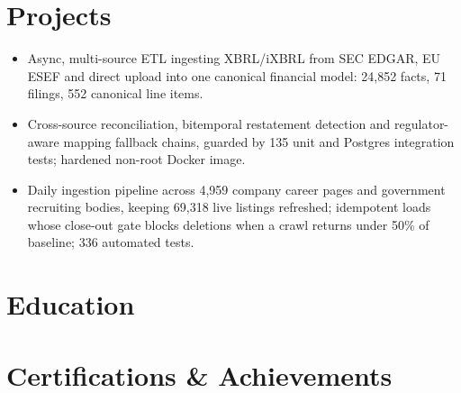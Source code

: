 \documentclass[10pt,a4paper]{article}
\begin{document}
\section{Projects}
\begin{itemize}
  \item Async, multi-source ETL ingesting XBRL/iXBRL from SEC EDGAR, EU ESEF and direct upload into one canonical financial model: 24,852 facts, 71 filings, 552 canonical line items.
  \item Cross-source reconciliation, bitemporal restatement detection and regulator-aware mapping fallback chains, guarded by 135 unit and Postgres integration tests; hardened non-root Docker image.
\end{itemize}

\begin{itemize}
  \item Daily ingestion pipeline across 4,959 company career pages and government recruiting bodies, keeping 69,318 live listings refreshed; idempotent loads whose close-out gate blocks deletions when a crawl returns under 50\% of baseline; 336 automated tests.
\end{itemize}

\section{Education}

\section{Certifications \& Achievements}
\end{document}
